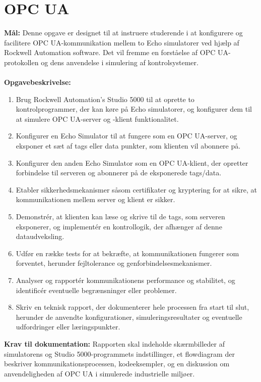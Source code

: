 \section{OPC UA}
\label{subsec:opcua_echo_simulation_rockwell}
\textbf{Mål:} Denne opgave er designet til at instruere studerende i at konfigurere og facilitere OPC UA-kommunikation mellem to Echo simulatorer ved hjælp af Rockwell Automation software. Det vil fremme en forståelse af OPC UA-protokollen og dens anvendelse i simulering af kontrolsystemer.
\\\\
\noindent\textbf{Opgavebeskrivelse:}
\begin{enumerate}
	\item Brug Rockwell Automation's Studio 5000 til at oprette to kontrolprogrammer, der kan køre på Echo simulatorer, og konfigurer dem til at simulere OPC UA-server og -klient funktionalitet.
	\item Konfigurer en Echo Simulator til at fungere som en OPC UA-server, og eksponer et sæt af tags eller data punkter, som klienten vil abonnere på.
	\item Konfigurer den anden Echo Simulator som en OPC UA-klient, der opretter forbindelse til serveren og abonnerer på de eksponerede tags/data.
	\item Etabler sikkerhedsmekanismer såsom certifikater og kryptering for at sikre, at kommunikationen mellem server og klient er sikker.
	\item Demonstrér, at klienten kan læse og skrive til de tags, som serveren eksponerer, og implementér en kontrollogik, der afhænger af denne dataudveksling.
	\item Udfør en række tests for at bekræfte, at kommunikationen fungerer som forventet, herunder fejltolerance og genforbindelsesmekanismer.
	\item Analyser og rapportér kommunikationens performance og stabilitet, og identificér eventuelle begrænsninger eller problemer.
	\item Skriv en teknisk rapport, der dokumenterer hele processen fra start til slut, herunder de anvendte konfigurationer, simuleringsresultater og eventuelle udfordringer eller læringspunkter.
\end{enumerate}	
\textbf{Krav til dokumentation:} Rapporten skal indeholde skærmbilleder af simulatorens og Studio 5000-programmets indstillinger, et flowdiagram der beskriver kommunikationsprocessen, kodeeksempler, og en diskussion om anvendeligheden af OPC UA i simulerede industrielle miljøer.

